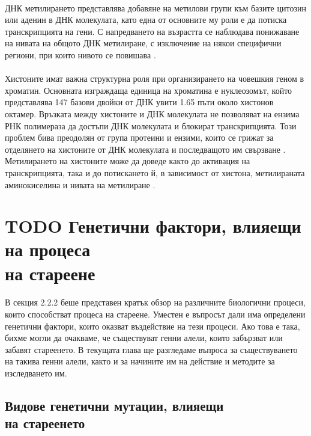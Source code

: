 \documentclass[pdftex,cyrillic,14pt,a4page,twoside,openright]{extreport}
\begin{document}
\paragraph{}
ДНК метилирането представлява добавяне на метилови групи към базите цитозин или аденин в ДНК молекулата, като една от основните му роли е да потиска транскрипцията на гени. С напредването на възрастта се наблюдава понижаване на нивата на общото ДНК метилиране, с изключение на някои специфични региони, при които нивото се повишава \cite{jung2015}.

\paragraph{}
Хистоните имат важна структурна роля при организирането на човешкия геном в хроматин. Основната изграждаща единица на хроматина е нуклеозомът, който представлява 147 базови двойки от ДНК увити 1.65 пъти около хистонов октамер. Връзката между хистоните и ДНК молекулата не позволяват на ензима РНК полимераза да достъпи ДНК молекулата и блокират транскрипцията. Този проблем бива преодолян от група протеини и ензими, които се грижат за отделянето на хистоните от ДНК молекулата и последващото им свързване \cite{das2012}. Метилирането на хистоните може да доведе както до активация на транскрипцията, така и до потискането й, в зависимост от хистона, метилираната аминокиселина и нивата на метилиране \cite{yi2020}.

\section[Генетични фактори, влияещи на процеса на стареене]{TODO Генетични фактори, влияещи на процеса\\ на стареене}
\paragraph{}
В секция 2.2.2 беше представен кратък обзор на различните биологични процеси, които способстват процеса на стареене. Уместен е въпросът дали има определени генетични фактори, които оказват въздействие на тези процеси. Ако това е така, бихме могли да очакваме, че съществуват генни алели, които забързват или забавят стареенето. В текущата глава ще разгледаме въпроса за съществуването на такива генни алели, както и за начините им на действие и методите за изследването им. 

\subsection[Видове генетични мутации, влияещи на стареенето]{Видове генетични мутации, влияещи\\ на стареенето}
\end{document}
